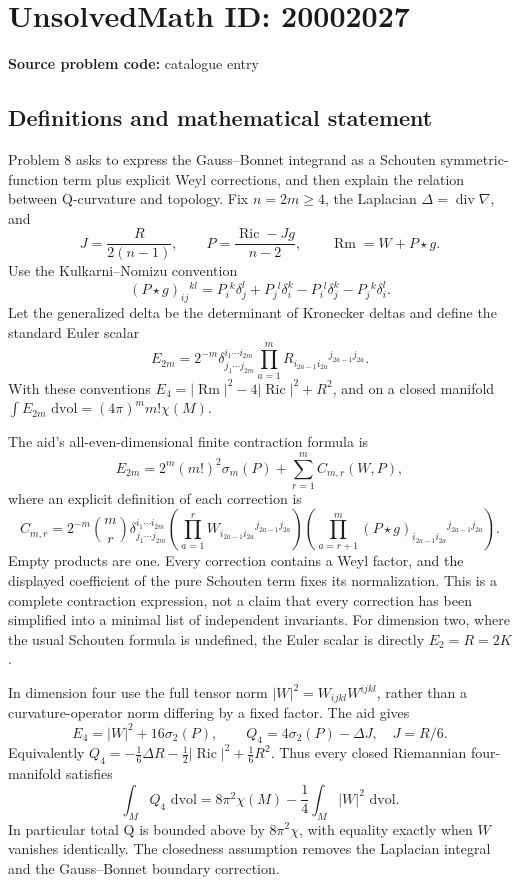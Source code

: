 \documentclass[11pt]{article}
\newcommand{\dd}{\,\mathrm{d}}
\begin{document}
\section*{UnsolvedMath ID: 20002027}
\textbf{Source problem code:} catalogue entry
\subsection{Definitions and mathematical statement}
Problem 8 asks to express the Gauss--Bonnet integrand as a Schouten symmetric-function term plus explicit Weyl corrections, and then explain the relation between Q-curvature and topology. Fix \(n=2m\geq4\), the Laplacian \(\Delta=\operatorname{div}\nabla\), and
\[
 J=\frac{R}{2(n-1)},\qquad
 P=\frac{\operatorname{Ric}-Jg}{n-2},\qquad
 \operatorname{Rm}=W+P\mathbin{\star} g.
\]
Use the Kulkarni--Nomizu convention
\[
 (P\mathbin{\star} g)_{ij}{}^{kl}
 =P_i{}^k\delta_j^l+P_j{}^l\delta_i^k
  -P_i{}^l\delta_j^k-P_j{}^k\delta_i^l.
\]
Let the generalized delta be the determinant of Kronecker deltas and define the standard Euler scalar
\[
 E_{2m}=2^{-m}\delta^{i_1\cdots i_{2m}}_{j_1\cdots j_{2m}}
 \prod_{a=1}^m R_{i_{2a-1}i_{2a}}{}^{j_{2a-1}j_{2a}}.
\]
With these conventions \(E_4=|\operatorname{Rm}|^2-4|\operatorname{Ric}|^2+R^2\), and on a closed manifold
\(\int E_{2m}\,\dd\mathrm{vol}=(4\pi)^m m!\chi(M)\).

The aid's all-even-dimensional finite contraction formula is
\[
 E_{2m}=2^m(m!)^2\sigma_m(P)+\sum_{r=1}^m C_{m,r}(W,P),
\]
where an explicit definition of each correction is
\[
 C_{m,r}=2^{-m}\binom mr
 \delta^{i_1\cdots i_{2m}}_{j_1\cdots j_{2m}}
 \left(\prod_{a=1}^r
 W_{i_{2a-1}i_{2a}}{}^{j_{2a-1}j_{2a}}\right)
 \left(\prod_{a=r+1}^m
 (P\mathbin{\star} g)_{i_{2a-1}i_{2a}}{}^{j_{2a-1}j_{2a}}\right).
\]
Empty products are one. Every correction contains a Weyl factor, and the displayed coefficient of the pure Schouten term fixes its normalization. This is a complete contraction expression, not a claim that every correction has been simplified into a minimal list of independent invariants. For dimension two, where the usual Schouten formula is undefined, the Euler scalar is directly \(E_2=R=2K\).

In dimension four use the full tensor norm \(|W|^2=W_{ijkl}W^{ijkl}\), rather than a curvature-operator norm differing by a fixed factor. The aid gives
\[
 E_4=|W|^2+16\sigma_2(P),\qquad
 Q_4=4\sigma_2(P)-\Delta J,
 \quad J=R/6.
\]
Equivalently \(Q_4=-\frac16\Delta R-\frac12|\operatorname{Ric}|^2+\frac16R^2\). Thus every closed Riemannian four-manifold satisfies
\[
 \int_MQ_4\,\dd\mathrm{vol}
 =8\pi^2\chi(M)-\frac14\int_M|W|^2\,\dd\mathrm{vol}.
\]
In particular total Q is bounded above by \(8\pi^2\chi\), with equality exactly when \(W\) vanishes identically. The closedness assumption removes the Laplacian integral and the Gauss--Bonnet boundary correction.
\end{document}
